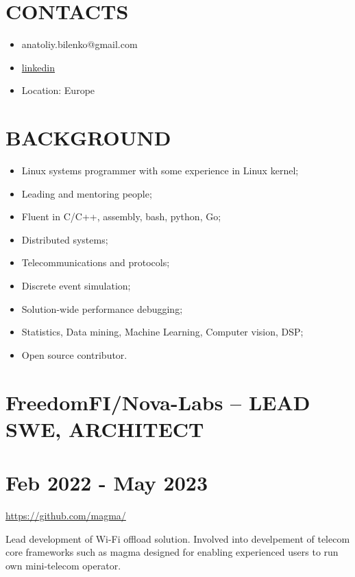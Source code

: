 \documentclass[8pt,a4paper]{article}
\author{Anatoliy Bilenko}
\date{\today}
\title{}
\renewcommand{\maketitle}{\begin{center}{\LARGE\bfseries \theauthor} \vspace{5pt} \smallbreak \thetitle \end{center}}
\begin{document}
\maketitle



\section*{CONTACTS}
\label{sec:org2d18999}
\begin{itemize}
\item anatoliy.bilenko@gmail.com
\item \href{https://www.linkedin.com/in/anatoliy-bilenko-4367055/}{linkedin}
\item Location: Europe
\end{itemize}

\section*{BACKGROUND}
\label{sec:org9d23cda}
\begin{itemize}
\item Linux systems programmer with some experience in Linux kernel;
\item Leading and mentoring people;
\item Fluent in C/C++, assembly, bash, python, Go;
\item Distributed systems;
\item Telecommunications and protocols;
\item Discrete event simulation;
\item Solution-wide performance debugging;
\item Statistics, Data mining, Machine Learning, Computer vision, DSP;
\item Open source contributor.
\end{itemize}


\section*{FreedomFI/Nova-Labs -- LEAD SWE, ARCHITECT}
\label{sec:org9087acf}
\section*{Feb 2022 - May 2023}
\label{sec:org378e4ca}

\url{https://github.com/magma/}

Lead development of Wi-Fi offload solution.
Involved into develpement of telecom core frameworks such as magma
designed for enabling experienced users to run own mini-telecom
operator.
\end{document}
